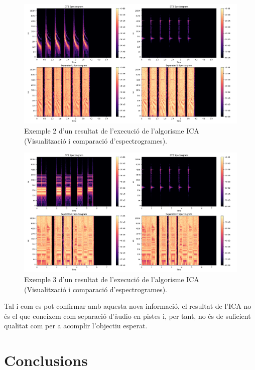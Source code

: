 \documentclass[10pt,a4paper,twocolumn,twoside]{article}
\begin{document}
\begin{figure}[h]
    \centering
    \includegraphics[width=1\linewidth]{img/ica_results/ica_results_spectogram_example_2.png}
    \caption{Exemple 2 d'un resultat de l'execució de l'algorisme ICA (Visualització i comparació d'espectrogrames).}
    \label{fig:ica_results-example2}
\end{figure}


\begin{figure}[h]
    \centering
    \includegraphics[width=1\linewidth]{img/ica_results/ica_results_spectogram_example_3.png}
    \caption{Exemple 3 d'un resultat de l'execució de l'algorisme ICA (Visualització i comparació d'espectrogrames).}
    \label{fig:ica_results-example3}
\end{figure}

Tal i com es pot confirmar amb aquesta nova informació, el resultat de l'ICA no és el que coneixem com separació d'àudio en pistes i, per tant, no és de suficient qualitat com per a acomplir l'objectiu esperat.

\section{Conclusions}
\end{document}
